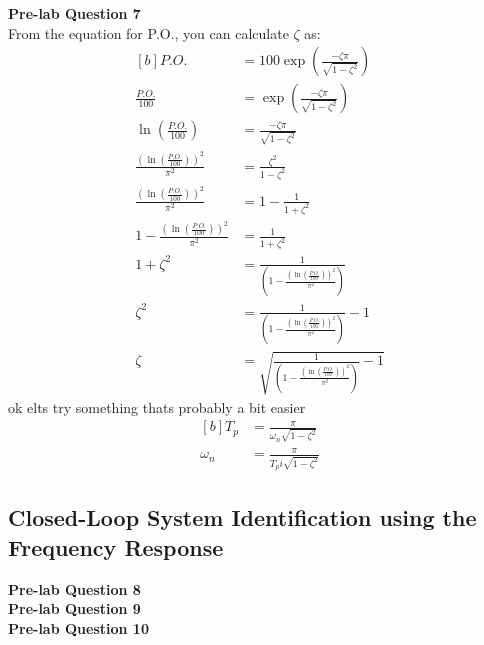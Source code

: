 \documentclass[12pt]{article}
\begin{document}
\textbf{Pre-lab Question 7} \\
From the equation for P.O., you can calculate $\zeta$ as:
\begin{equation}
\begin{aligned}[b]
    P.O. &= 100\exp\left(\frac{-\zeta\pi}{\sqrt{1-\zeta^2}}\right) \\
    \frac{P.O.}{100} &= \exp\left(\frac{-\zeta\pi}{\sqrt{1-\zeta^2}}\right) \\
    \ln \left( \frac{P.O.}{100} \right) &= \frac{-\zeta\pi}{\sqrt{1-\zeta^2}} \\
    \frac{\left( \ln \left( \frac{P.O.}{100} \right) \right)^2}{\pi^2} &= \frac{\zeta^2}{1-\zeta^2} \\
    \frac{\left( \ln \left( \frac{P.O.}{100} \right) \right)^2}{\pi^2} &= 1 - \frac{1}{1+\zeta^2} \\
    1 - \frac{\left( \ln \left( \frac{P.O.}{100} \right) \right)^2}{\pi^2} &= \frac{1}{1+\zeta^2} \\
    1 + \zeta^2 &= \frac{1}{\left( 1 - \frac{\left( \ln \left( \frac{P.O.}{100} \right) \right)^2}{\pi^2} \right)} \\
    \zeta^2 &= \frac{1}{\left( 1 - \frac{\left( \ln \left( \frac{P.O.}{100} \right) \right)^2}{\pi^2} \right)} - 1 \\
    \zeta &= \sqrt{\frac{1}{\left( 1 - \frac{\left( \ln \left( \frac{P.O.}{100} \right) \right)^2}{\pi^2} \right)} - 1}
\end{aligned}
\end{equation}
ok elts try something thats probably a bit easier
\begin{equation}
\begin{aligned}[b]
    T_p &= \frac{\pi}{\omega_n\sqrt{1-\zeta^2}} \\
    \omega_n &= \frac{\pi}{T_pi\sqrt{1-\zeta^2}} %
\end{aligned}
\end{equation}

\subsection{Closed-Loop System Identification using the Frequency Response}
\textbf{Pre-lab Question 8} \\

\textbf{Pre-lab Question 9} \\

\textbf{Pre-lab Question 10} \\
\end{document}
